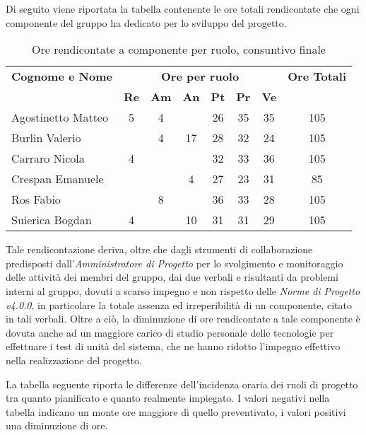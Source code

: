 Di seguito viene riportata la tabella contenente le ore totali rendicontate che ogni componente del gruppo ha dedicato per lo sviluppo del progetto.

\begin{table}[h]
	\centering
	\begin{tabular}{|l|c|c|c|c|c|c|c|}
		\toprule
		\textbf{Cognome e Nome} & \multicolumn{6}{c}{\textbf{Ore per ruolo}} & \textbf{Ore Totali} \\
		& \textbf{Re} & \textbf{Am} & \textbf{An} & \textbf{Pt} & \textbf{Pr} & \textbf{Ve} & \\
		
		\midrule
		Agostinetto Matteo & 5 & 4 & & 26 & 35 & 35 & 105 \\
		Burlin Valerio & & 4 & 17 & 28 & 32 & 24 & 105 \\ 
		Carraro Nicola & 4 & & & 32 & 33 & 36 & 105 \\
		Crespan Emanuele & & & 4 & 27 & 23 & 31 & 85 \\
		Ros Fabio & & 8 & & 36 & 33 & 28 & 105 \\
		Suierica Bogdan & 4 & & 10 & 31 & 31 & 29 & 105 \\
		
		\bottomrule
	\end{tabular}
	\caption{Ore rendicontate a componente per ruolo, consuntivo finale}
\end{table}

\noindent Tale rendicontazione deriva, oltre che dagli strumenti di collaborazione predisposti dall'\textit{Amministratore di Progetto} per lo svolgimento e monitoraggio delle attività dei membri del gruppo, dai due verbali \textit{} e \textit{} risultanti da problemi interni al gruppo, dovuti a scarso impegno e non rispetto delle \textit{Norme di Progetto v4.0.0}, in particolare la totale assenza ed irreperibilità di un componente, citato in tali verbali. Oltre a ciò, la diminuzione di ore rendicontate a tale componente è dovuta anche ad un maggiore carico di studio personale delle tecnologie per effettuare i test di unità del sistema, che ne hanno ridotto l'impegno effettivo nella realizzazione del progetto. 

\noindent La tabella seguente riporta le differenze dell'incidenza oraria dei ruoli di progetto tra quanto pianificato e quanto realmente impiegato. I valori negativi nella tabella indicano un monte ore maggiore di quello preventivato, i valori positivi una diminuzione di ore.

